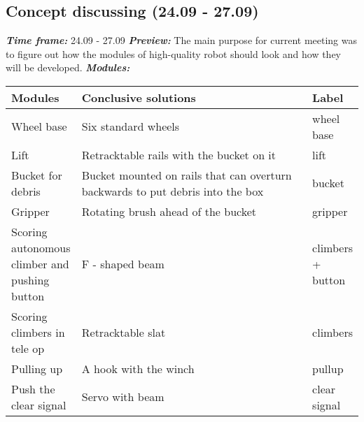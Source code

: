 \subsection{Concept discussing (24.09 - 27.09)}
\textit{\textbf{Time frame:}} 24.09 - 27.09 \newline
\textit{\textbf{Preview:}} The main purpose for current meeting was to figure out how the modules of high-quality robot should look and how they will be developed. \newline \newline
\textit{\textbf{Modules:}}

\begin{table}[H]
	\vspace{-2mm}
	\begin{center}
		\begin{tabular}{|p{0.2\linewidth}|p{0.7\linewidth}|p{0.1\linewidth}|}
			\hline
			Modules & Conclusive solutions & Label \\
			\hline
			Wheel base & Six standard wheels & wheel base \\
			\hline
			Lift & Retracktable rails with the bucket on it & lift \\
			\hline
			Bucket for debris & Bucket mounted on rails that can overturn backwards to put debris into the box & bucket \\
			\hline
			Gripper & Rotating brush ahead of the bucket & gripper\\
			\hline
			Scoring autonomous climber and pushing button & F - shaped beam & climbers + button\\
			\hline
			Scoring climbers in tele op & Retracktable slat & climbers\\
			\hline
			Pulling up & A hook with the winch & pullup\\
			\hline
			Push the clear signal & Servo with beam & clear signal\\
			\hline
		\end{tabular}
	\end{center}
\end{table}

